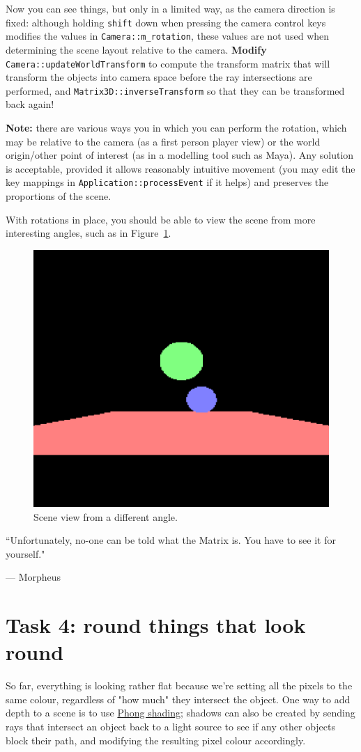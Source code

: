 \documentclass{../../../fal_assignment}
\begin{document}
Now you can see things, but only in a limited way, as the camera direction is fixed: although holding \texttt{shift} down when pressing the camera control keys modifies the values in \lstinline{Camera::m_rotation}, these values are not used when determining the scene layout relative to the camera. \textbf{Modify} \lstinline{Camera::updateWorldTransform} to compute the transform matrix that will transform the objects into camera space before the ray intersections are performed, and \lstinline{Matrix3D::inverseTransform} so that they can be transformed back again!

\textbf{Note:} there are various ways you in which you can perform the rotation, which may be relative to the camera (as a first person player view) or the world origin/other point of interest (as in a modelling tool such as Maya). Any solution is acceptable, provided it allows reasonably intuitive movement (you may edit the key mappings in \lstinline{Application::processEvent} if it helps) and preserves the proportions of the scene.

With rotations in place, you should be able to view the scene from more interesting angles, such as in  Figure~\ref{fig:rotate}.

\begin{figure}[ht]
	\begin{center}
		\includegraphics[width=0.25\linewidth]{rotate}
	\end{center}
	\caption{Scene view from a different angle.}
	\label{fig:rotate}
\end{figure}

\begin{marginquote}
``Unfortunately, no-one can be told what the Matrix is. You have to see it for yourself."

\par --- Morpheus
\end{marginquote}

\section*{Task 4: round things that look round}

So far, everything is looking rather flat because we're setting all the pixels to the same colour, regardless of "how much" they intersect the object. One way to add depth to a scene is to use \href{https://users.cs.northwestern.edu/~ago820/cs395/Papers/Phong_1975.pdf}{Phong shading}; shadows can also be created by sending rays that intersect an object back to a light source to see if any other objects block their path, and modifying the resulting pixel colour accordingly.
\end{document}
